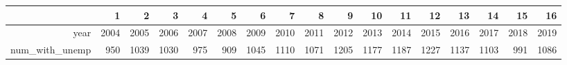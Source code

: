 \begin{table}[ht]
\centering
\begin{tabular}{rrrrrrrrrrrrrrrrr}
  \hline
 & 1 & 2 & 3 & 4 & 5 & 6 & 7 & 8 & 9 & 10 & 11 & 12 & 13 & 14 & 15 & 16 \\ 
  \hline
year & 2004 & 2005 & 2006 & 2007 & 2008 & 2009 & 2010 & 2011 & 2012 & 2013 & 2014 & 2015 & 2016 & 2017 & 2018 & 2019 \\ 
  num\_with\_unemp & 950 & 1039 & 1030 & 975 & 909 & 1045 & 1110 & 1071 & 1205 & 1177 & 1187 & 1227 & 1137 & 1103 & 991 & 1086 \\ 
   \hline
\end{tabular}
\end{table}
